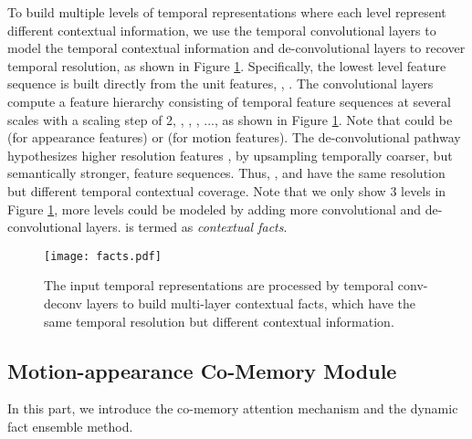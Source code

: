 \documentclass[10pt,twocolumn,letterpaper]{article}
\begin{document}
To build multiple levels of temporal representations where each level represent different contextual information, we use the temporal convolutional layers to model the temporal contextual information and de-convolutional layers to recover temporal resolution, as shown in Figure \ref{fig:facts}. Specifically, the lowest level feature sequence is built directly from the unit features, , . The convolutional layers compute a feature hierarchy consisting of temporal feature sequences at several scales with a scaling step of 2, , , , ..., as shown in Figure \ref{fig:facts}. Note that  could be  (for appearance features) or  (for motion features). The de-convolutional pathway hypothesizes higher resolution features ,  by upsampling temporally coarser, but semantically stronger, feature sequences. Thus, ,  and  have the same resolution but different temporal contextual coverage. Note that we only show 3 levels in Figure \ref{fig:facts}, more levels could be modeled by adding more convolutional and de-convolutional layers.  is termed as \emph{contextual facts}.


\begin{figure}[]
  \centering
    \texttt{[image: facts.pdf]}
    \caption{The input temporal representations are processed by temporal conv-deconv layers to build multi-layer contextual facts, which have the same temporal resolution but different contextual information.}
      \label{fig:facts}
\end{figure}

\subsection{Motion-appearance Co-Memory Module}
In this part, we introduce the co-memory attention mechanism and the dynamic fact ensemble method. 
\end{document}
